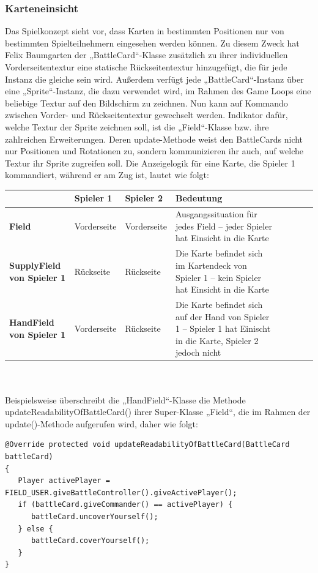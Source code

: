 \subsubsection{Karteneinsicht}
Das Spielkonzept sieht vor, dass Karten in bestimmten Positionen nur von bestimmten Spielteilnehmern eingesehen werden können.
Zu diesem Zweck hat Felix Baumgarten der „BattleCard“-Klasse zusätzlich zu ihrer individuellen Vorderseitentextur eine statische Rückseitentextur hinzugefügt, die für jede Instanz die gleiche sein wird. Außerdem verfügt jede „BattleCard“-Instanz über eine „Sprite“-Instanz, die dazu verwendet wird, im Rahmen des Game Loops eine beliebige Textur auf den Bildschirm zu zeichnen. Nun kann auf Kommando zwischen Vorder- und Rückseitentextur gewechselt werden.
Indikator dafür, welche Textur der Sprite zeichnen soll, ist die „Field“-Klasse bzw. ihre zahlreichen Erweiterungen. Deren update-Methode weist den BattleCards nicht nur Positionen und Rotationen zu, sondern kommunizieren ihr auch, auf welche Textur ihr Sprite zugreifen soll.
Die Anzeigelogik für eine Karte, die Spieler 1 kommandiert, während er am Zug ist, lautet wie folgt:
\\
\begin{tabular}{|p{4cm}|p{4cm}|p{4cm}|p{4.5cm}| l | c | c | r |}
\hline
 & \textbf{Spieler 1}  & \textbf{Spieler 2} & \textbf{Bedeutung} \\ \hline
\textbf{Field} & Vorderseite  & Vorderseite & Ausgangssituation für jedes Field – jeder Spieler hat Einsicht in die Karte \\ \hline
\textbf{SupplyField von Spieler 1} & Rückseite & Rückseite & Die Karte befindet sich im Kartendeck von Spieler 1 – kein Spieler hat Einsicht in die Karte \\ \hline
\textbf{HandField von Spieler 1} & Vorderseite & Rückseite & Die Karte befindet sich auf der Hand von Spieler 1 – Spieler 1 hat Einischt in die Karte, Spieler 2 jedoch nicht \\
\hline
\end{tabular}
\\ \\
Beispielsweise überschreibt die „HandField“-Klasse die Methode updateReadabilityOfBattleCard() ihrer Super-Klasse „Field“, die im Rahmen der update()-Methode aufgerufen wird, daher wie folgt:

\begin{lstlisting}
@Override protected void updateReadabilityOfBattleCard(BattleCard battleCard)
{
   Player activePlayer = FIELD_USER.giveBattleController().giveActivePlayer();
   if (battleCard.giveCommander() == activePlayer) {
      battleCard.uncoverYourself();
   } else {
      battleCard.coverYourself();
   }
}
\end{lstlisting}

